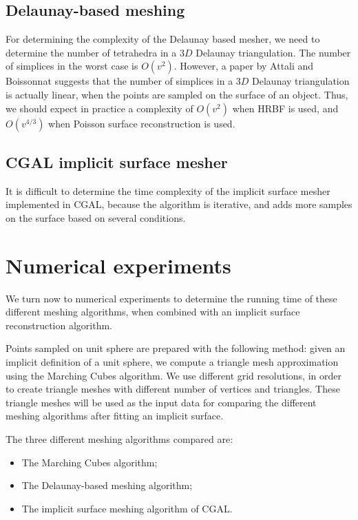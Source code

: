 \documentclass{article}
\begin{document}
\subsection{Delaunay-based meshing}
For determining the complexity of the Delaunay based mesher, we need to determine the number of tetrahedra in a $3D$ Delaunay triangulation. 
The number of simplices in the worst case is $O(v^2)$. 
However, a paper by Attali and Boissonnat \cite{AB04} suggests that the number of simplices in a $3D$ Delaunay triangulation is actually linear, when the points are sampled on the surface of an object.
Thus, we should expect in practice a complexity of $O(v^2)$ when HRBF is used, and $O(v^{4/3})$ when Poisson surface reconstruction is used.

\subsection{CGAL implicit surface mesher}
It is difficult to determine the time complexity of the implicit surface mesher implemented in CGAL, 
because the algorithm is iterative, and adds more samples on the surface based on several conditions. 


\section{Numerical experiments}
\label{sec:mesh_exp}
We turn now to numerical experiments to determine the running time of these different meshing algorithms, when combined with an implicit surface reconstruction algorithm.

Points sampled on unit sphere are prepared with the following method:
given an implicit definition of a unit sphere, we compute a triangle mesh approximation using the Marching Cubes algorithm. We use different grid resolutions, in order to create triangle meshes with different number of vertices and triangles. These triangle meshes will be used as the input data for comparing the different meshing algorithms after fitting an implicit surface.

The three different meshing algorithms compared are:
\begin{itemize}
\item The Marching Cubes algorithm; 
\item The Delaunay-based meshing algorithm; 
\item The implicit surface meshing algorithm of CGAL.
\end{itemize}
\end{document}
